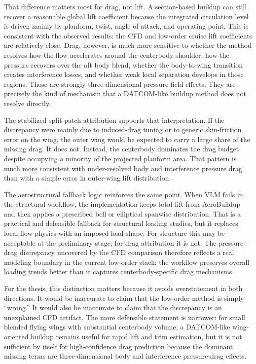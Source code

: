 \documentclass[12pt]{report}
\begin{document}
That difference matters most for drag, not lift. A section-based buildup can still recover a reasonable global lift coefficient because the integrated circulation level is driven mainly by planform, twist, angle of attack, and operating point. This is consistent with the observed results: the CFD and low-order cruise lift coefficients are relatively close. Drag, however, is much more sensitive to whether the method resolves how the flow accelerates around the centerbody shoulder, how the pressure recovers over the aft body blend, whether the body-to-wing transition creates interference losses, and whether weak local separation develops in those regions. Those are strongly three-dimensional pressure-field effects. They are precisely the kind of mechanism that a DATCOM-like buildup method does not resolve directly.

The stabilized split-patch attribution supports that interpretation. If the discrepancy were mainly due to induced-drag tuning or to generic skin-friction error on the wing, the outer wing would be expected to carry a large share of the missing drag. It does not. Instead, the centerbody dominates the drag budget despite occupying a minority of the projected planform area. That pattern is much more consistent with under-resolved body and interference pressure drag than with a simple error in outer-wing lift distribution.

The aerostructural fallback logic reinforces the same point. When VLM fails in the structural workflow, the implementation keeps total lift from AeroBuildup and then applies a prescribed bell or elliptical spanwise distribution. That is a practical and defensible fallback for structural loading studies, but it replaces local flow physics with an imposed load shape. For structure this may be acceptable at the preliminary stage; for drag attribution it is not. The pressure-drag discrepancy uncovered by the CFD comparison therefore reflects a real modeling boundary in the current low-order stack: the workflow preserves overall loading trends better than it captures centerbody-specific drag mechanisms.

For the thesis, this distinction matters because it avoids overstatement in both directions. It would be inaccurate to claim that the low-order method is simply ``wrong.'' It would also be inaccurate to claim that the discrepancy is an unexplained CFD artifact. The more defensible statement is narrower: for small blended flying wings with substantial centerbody volume, a DATCOM-like wing-oriented buildup remains useful for rapid lift and trim estimation, but it is not sufficient by itself for high-confidence drag prediction because the dominant missing terms are three-dimensional body and interference pressure-drag effects.
\end{document}
